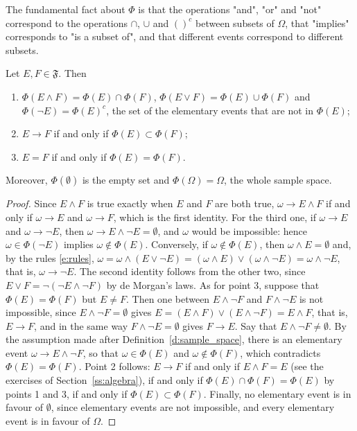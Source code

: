 The fundamental fact about $\Phi$ is that the operations "and", "or" and "not" correspond to the operations $\cap$, $\cup$ and $()^c$ between subsets of $\Omega$, that "implies" corresponds to "is a subset of", and that different events correspond to different subsets. 
\begin{proposition}
	\label{p:subset}
	Let $E, F \in \mathfrak F$. Then 
	\begin{enumerate}
		\item $\Phi(E \wedge F) = \Phi(E) \cap \Phi(F)$, $\Phi(E \vee F) = \Phi(E) \cup \Phi(F)$ and $\Phi(\neg E) = \Phi(E)^c$, the set of the elementary events that are not in $\Phi(E)$;
		\item $E \rightarrow F$ if and only if $\Phi(E) \subset \Phi(F)$; 
		\item $E = F$ if and only if $\Phi(E) = \Phi(F)$. 
	\end{enumerate}
	Moreover, $\Phi(\emptyset)$ is the empty set and $\Phi(\Omega) = \Omega$, the whole sample space. 
\end{proposition}
\begin{proof}
	Since $E \wedge F$ is true exactly when $E$ and $F$ are both true, $\omega \rightarrow E \wedge F$ if and only if $\omega \rightarrow E$ and $\omega \rightarrow F$, which is the first identity. For the third one, if $\omega \rightarrow E$ and $\omega \rightarrow \neg E$, then $\omega \rightarrow E \wedge \neg E = \emptyset$, and $\omega$ would be impossible: hence $\omega \in \Phi(\neg E)$ implies $\omega \notin \Phi(E)$. Conversely, if $\omega \notin \Phi(E)$, then $\omega \wedge E = \emptyset$ and, by the rules \eqref{e:rules}, $\omega = \omega \wedge (E \vee \neg E) = (\omega \wedge E) \vee (\omega \wedge \neg E) = \omega \wedge \neg E$, that is, $\omega \rightarrow \neg E$. The second identity follows from the other two, since $E \vee F = \neg(\neg E \wedge \neg F)$ by de Morgan's laws. 
	As for point 3, suppose that $\Phi(E) = \Phi(F)$ but $E \neq F$. Then one between $E \wedge \neg F$ and $F \wedge \neg E$ is not impossible, since $E \wedge \neg F = \emptyset$ gives $E = (E \wedge F) \vee (E \wedge \neg F) = E \wedge F$, that is, $E \rightarrow F$, and in the same way $F \wedge \neg E = \emptyset$ gives $F \rightarrow E$. Say that $E \wedge \neg F \neq \emptyset$. By the assumption made after Definition~\ref{d:sample_space}, there is an elementary event $\omega \rightarrow E \wedge \neg F$, so that $\omega \in \Phi(E)$ and $\omega \notin \Phi(F)$, which contradicts $\Phi(E) = \Phi(F)$. 
	Point 2 follows: $E \rightarrow F$ if and only if $E \wedge F = E$ (see the exercises of Section~\ref{ss:algebra}), if and only if $\Phi(E) \cap \Phi(F) = \Phi(E)$ by points 1 and 3, if and only if $\Phi(E) \subset \Phi(F)$. Finally, no elementary event is in favour of $\emptyset$, since elementary events are not impossible, and every elementary event is in favour of $\Omega$. 
\end{proof}

